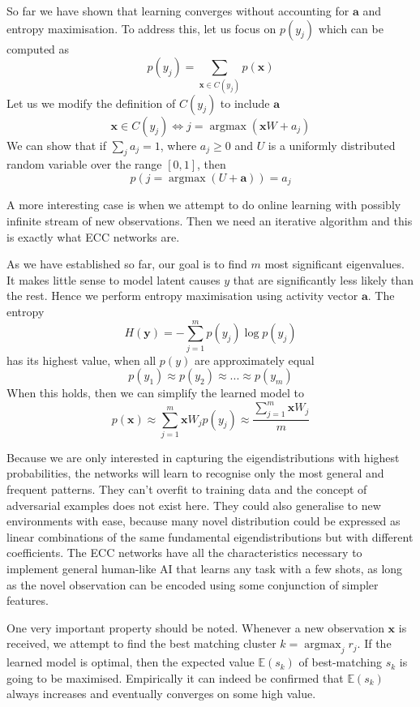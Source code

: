 \documentclass[12pt]{article}
\DeclareMathOperator*{\argmax}{argmax}
\begin{document}
So far we have shown that learning converges without accounting for $\boldsymbol{a}$ and entropy maximisation. To address this, let us focus on $p(y_j)$ which can be computed as
\[
p(y_j) = \sum_{\boldsymbol{x}\in C(y_j)}p(\boldsymbol{x})
\]
Let us we modify the definition of $C(y_j)$ to include $\boldsymbol{a}$ 
\[
\boldsymbol{x} \in C(y_j) \iff  j = \argmax(\boldsymbol{x} W + a_j)
\]
We can show that if $\sum_j a_j = 1$, where $a_j\ge 0$ and $U$ is a uniformly distributed random variable over the range $[0,1]$, then 
\[
p(j = \argmax(U + \boldsymbol{a} )) = a_j
\]

A more interesting case is when we attempt to do online learning with possibly infinite stream of new observations. Then we need an iterative algorithm and this is exactly what ECC networks are. 

As we have established so far, our goal is to find $m$ most significant eigenvalues. It makes little sense to model latent causes $y$ that are significantly less likely than the rest. Hence we perform entropy maximisation using activity vector $\boldsymbol{a}$. The entropy
\[
H(\boldsymbol{y}) = - \sum_{j=1}^{m}p(y_j)\log p(y_j)
\]
has its highest value, when all $p(y)$ are approximately equal
\[
p(y_1)\approx p(y_2)\approx...\approx p(y_m)
\]
When this holds, then we can simplify the learned model to
\[
p(\boldsymbol{x}) \approx \sum_{j=1}^{m}\boldsymbol{x}W_jp(y_j) \approx \frac{\sum_{j=1}^{m}\boldsymbol{x}W_j}{m}
\]

Because we are only interested in capturing the eigendistributions with highest probabilities, the networks will learn to recognise only the most general and frequent patterns. They can't overfit to training data and the concept of adversarial examples does not exist here. They could also generalise to new environments with ease, because many novel distribution could be expressed as linear combinations of the same fundamental eigendistributions but with different coefficients. The ECC networks have all the characteristics necessary to implement general human-like AI that learns any task with a few shots, as long as the novel observation can be encoded using some conjunction of simpler features.

One very important property should be noted. Whenever a new observation $\boldsymbol{x}$ is received, we attempt to find the best matching cluster $k=\argmax_j r_j$. If the learned model is optimal, then the expected value $\mathbb{E}(s_k)$ of best-matching $s_k$ is going to be maximised. Empirically it can indeed be confirmed that $\mathbb{E}(s_k)$ always increases and eventually converges on some high value.
\end{document}

